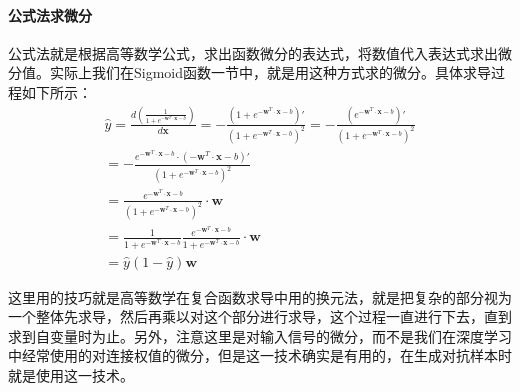 \documentclass[UTF8]{article}
\begin{document}
\paragraph{公式法求微分}
公式法就是根据高等数学公式，求出函数微分的表达式，将数值代入表达式求出微分值。实际上我们在Sigmoid函数一节中，就是用这种方式求的微分。具体求导过程如下所示：
\begin{equation}
\begin{aligned}
\hat{y}=\frac{d(\frac{1}{1+e^{-\boldsymbol{w}^T \cdot \boldsymbol{x}-b}})}{d\boldsymbol{x}}=-\frac{(1+e^{-\boldsymbol{w}^T \cdot \boldsymbol{x}-b})'}{(1+e^{-\boldsymbol{w}^T \cdot \boldsymbol{x}-b})^2}=-\frac{(e^{-\boldsymbol{w}^T \cdot \boldsymbol{x}-b})'}{(1+e^{-\boldsymbol{w}^T \cdot \boldsymbol{x}-b})^2}\\
=-\frac{e^{-\boldsymbol{w}^T \cdot \boldsymbol{x}-b} \cdot (-\boldsymbol{w}^T \cdot \boldsymbol{x}-b)'}{(1+e^{-\boldsymbol{w}^T \cdot \boldsymbol{x}-b})^2}\\
=\frac{e^{-\boldsymbol{w}^T \cdot \boldsymbol{x}-b} }{(1+e^{-\boldsymbol{w}^T \cdot \boldsymbol{x}-b})^2} \cdot \boldsymbol{w} \\
=\frac{1}{1+e^{-\boldsymbol{w}^T \cdot \boldsymbol{x}-b}}\frac{e^{-\boldsymbol{w}^T \cdot \boldsymbol{x}-b} }{1+e^{-\boldsymbol{w}^T \cdot \boldsymbol{x}-b}} \cdot \boldsymbol{w} \\
=\hat{y}(1-\hat{y})\boldsymbol{w}
\end{aligned}
\label{mlp-math-devirative-formula}
\end{equation}

这里用的技巧就是高等数学在复合函数求导中用的换元法，就是把复杂的部分视为一个整体先求导，然后再乘以对这个部分进行求导，这个过程一直进行下去，直到求到自变量时为止。另外，注意这里是对输入信号的微分，而不是我们在深度学习中经常使用的对连接权值的微分，但是这一技术确实是有用的，在生成对抗样本时就是使用这一技术。
\end{document}
